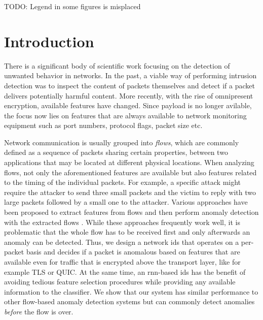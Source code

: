 \documentclass[conference]{IEEEtran}
\newcommand\note[2]{{\color{#1}#2}}
\newcommand\todo[1]{{\note{red}{TODO: #1}}}
\begin{document}
\maketitle

\todo{Legend in some figures is misplaced}

\section{Introduction}

There is a significant body of scientific work focusing on the detection of unwanted behavior in networks. In the past, a viable way of performing intrusion detection was to inspect the content of packets themselves and detect if a packet delivers potentially harmful content. More recently, with the rise of omnipresent encryption, available features have changed. Since payload is no longer avilable, the focus now lies on features that are always available to network monitoring equipment such as port numbers, protocol flags, packet size etc. 

Network communication is usually grouped into \textit{flows}, which are commonly defined as a sequence of packets sharing certain properties, between two applications that may be located at different physical locations.
When analyzing flows, not only the aforementioned features are available but also features related to the timing of the individual packets. %
For example, a specific attack might require the attacker to send three small packets and the victim to reply with two large packets followed by a small one to the attacker. Various approaches have been proposed to extract features from flows and then perform anomaly detection with the extracted flows \cite{meghdouri_analysis_2018}.
While these approaches frequently work well, it is problematic that the whole flow has to be received first and only afterwards an anomaly can be detected. Thus, we design a network \gls{ids} that operates on a per-packet basis and decides if a packet is anomalous based on features that are available even for traffic that is encrypted above the transport layer, like for example TLS or QUIC.
At the same time, an \gls{rnn}-based \gls{ids} has the benefit of avoiding tedious feature selection procedures while providing any available information to the classifier.
We show that our system has similar performance to other flow-based anomaly detection systems but can commonly detect anomalies \textit{before} the flow is over. 
\end{document}
